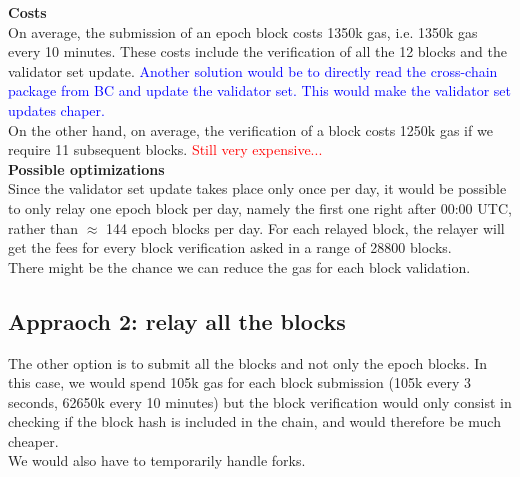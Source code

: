 \noindent
\textbf{Costs}\\
On average, the submission of an epoch block costs 1350k gas, i.e. 1350k gas every 10 minutes. These costs include the verification of all the 12 blocks and the validator set update. \textcolor{blue}{Another solution would be to directly read the cross-chain package from BC and update the validator set. This would make the validator set updates chaper.}\\On the other hand, on average, the verification of a block costs 1250k gas if we require 11 subsequent blocks.
\textcolor{red}{Still very expensive...}\\


\noindent
\textbf{Possible optimizations}\\
Since the validator set update takes place only once per day, it would be possible to only relay one epoch block per day, namely the first one right after 00:00 UTC, rather than $\approx$ 144 epoch blocks per day. For each relayed block, the relayer will get the fees for every block verification asked in a range of 28800 blocks.\\
There might be the chance we can reduce the gas for each block validation.\\


\subsection{Appraoch 2: relay all the blocks}
The other option is to submit all the blocks and not only the epoch blocks. In this case, we would spend 105k gas for each block submission (105k every 3 seconds, 62650k every 10 minutes) but the block verification would only consist in checking if the block hash is included in the chain, and would therefore be much cheaper.\\ We would also have to temporarily handle forks.  

